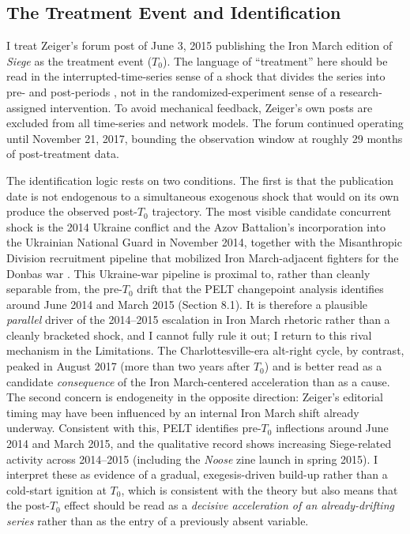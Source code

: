 \documentclass[bibtex,autowc,nonblind]{apsr_submission}
\begin{document}
\subsection{The Treatment Event and Identification}

I treat Zeiger's forum post of June 3, 2015 publishing the Iron March edition of \textit{Siege} as the treatment event ($T_0$). The language of ``treatment'' here should be read in the interrupted-time-series sense of a shock that divides the series into pre- and post-periods \citep{bernal2017interrupted, wagner2002segmented}, not in the randomized-experiment sense of a research-assigned intervention. To avoid mechanical feedback, Zeiger's own posts are excluded from all time-series and network models. The forum continued operating until November 21, 2017, bounding the observation window at roughly 29 months of post-treatment data.

The identification logic rests on two conditions. The first is that the publication date is not endogenous to a simultaneous exogenous shock that would on its own produce the observed post-$T_0$ trajectory. The most visible candidate concurrent shock is the 2014 Ukraine conflict and the Azov Battalion's incorporation into the Ukrainian National Guard in November 2014, together with the Misanthropic Division recruitment pipeline that mobilized Iron March-adjacent fighters for the Donbas war \citep{colborne2022fires}. This Ukraine-war pipeline is proximal to, rather than cleanly separable from, the pre-$T_0$ drift that the PELT changepoint analysis identifies around June 2014 and March 2015 (Section 8.1). It is therefore a plausible \textit{parallel} driver of the 2014--2015 escalation in Iron March rhetoric rather than a cleanly bracketed shock, and I cannot fully rule it out; I return to this rival mechanism in the Limitations. The Charlottesville-era alt-right cycle, by contrast, peaked in August 2017 (more than two years after $T_0$) and is better read as a candidate \textit{consequence} of the Iron March-centered acceleration than as a cause. The second concern is endogeneity in the opposite direction: Zeiger's editorial timing may have been influenced by an internal Iron March shift already underway. Consistent with this, PELT identifies pre-$T_0$ inflections around June 2014 and March 2015, and the qualitative record shows increasing Siege-related activity across 2014--2015 (including the \textit{Noose} zine launch in spring 2015). I interpret these as evidence of a gradual, exegesis-driven build-up rather than a cold-start ignition at $T_0$, which is consistent with the theory but also means that the post-$T_0$ effect should be read as a \textit{decisive acceleration of an already-drifting series} rather than as the entry of a previously absent variable.
\end{document}
